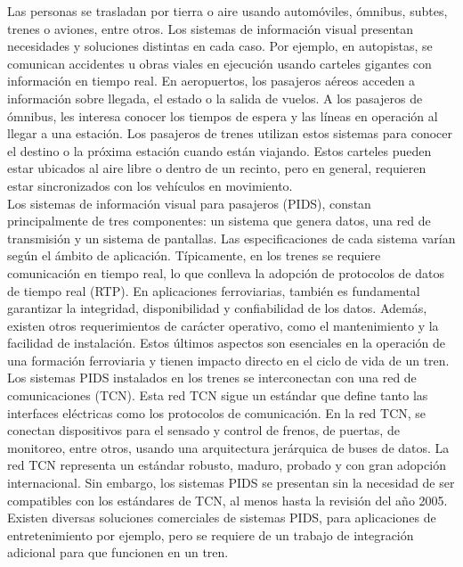  Las personas se trasladan por tierra o aire usando automóviles, ómnibus, subtes, trenes o aviones, entre otros. Los sistemas de información visual presentan necesidades y soluciones distintas en cada caso. Por ejemplo, en autopistas, se comunican accidentes u obras viales en ejecución usando carteles gigantes con información en tiempo real. En aeropuertos, los pasajeros aéreos acceden a información sobre llegada, el estado o la salida de vuelos. A los pasajeros de ómnibus, les interesa conocer los tiempos de espera y las líneas en operación al llegar a una estación. Los pasajeros de trenes utilizan estos sistemas para conocer el destino o la próxima estación cuando están viajando. Estos carteles pueden estar ubicados al aire libre o dentro de un recinto, pero en general,  requieren estar sincronizados con los vehículos en movimiento. \\

Los sistemas de información visual para pasajeros (PIDS), constan principalmente de tres componentes: un sistema que genera datos, una red de transmisión y un sistema de pantallas. Las especificaciones de cada sistema varían según el ámbito de aplicación. Típicamente, en los trenes se requiere comunicación en tiempo real, lo que conlleva la adopción de protocolos de datos de tiempo real (RTP). En aplicaciones ferroviarias, también es fundamental garantizar la integridad, disponibilidad y confiabilidad de los datos. Además, existen otros requerimientos de carácter operativo, como el mantenimiento y la facilidad de instalación. Estos últimos aspectos son esenciales en la operación de una formación ferroviaria y tienen impacto directo en el ciclo de vida de un tren.\\

 Los sistemas PIDS instalados en los trenes se interconectan con una red de comunicaciones (TCN). Esta red TCN sigue un estándar que define tanto las interfaces eléctricas como los protocolos de comunicación. En la red TCN, se conectan dispositivos para el sensado y control de frenos, de puertas, de monitoreo, entre otros, usando una arquitectura jerárquica de buses de datos. La red TCN representa un estándar robusto, maduro, probado y con gran adopción internacional. Sin embargo, los sistemas PIDS se presentan sin la necesidad de ser compatibles con los estándares de TCN, al menos hasta la revisión del año 2005. Existen diversas soluciones comerciales de sistemas PIDS, para aplicaciones de entretenimiento por ejemplo, pero se requiere de un trabajo de integración adicional para que funcionen en un tren.\\
 
